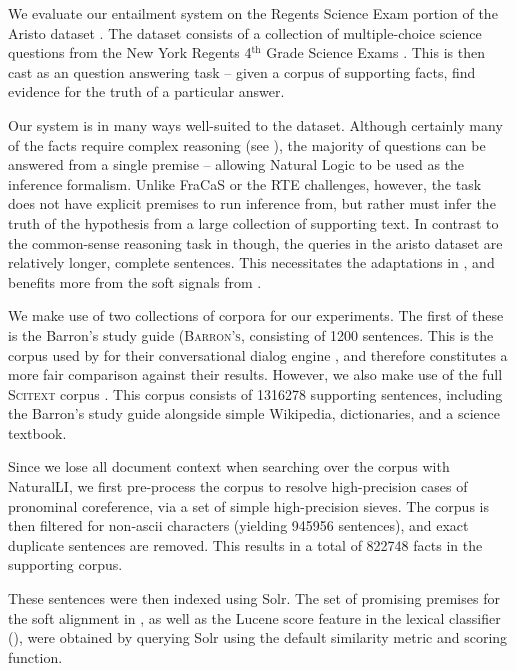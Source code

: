 %
%
We evaluate our entailment system on the Regents Science Exam portion of
  the Aristo dataset \cite{key:2013clark-aristo,key:2015clark-aristo}.
The dataset consists of a collection of multiple-choice science questions
  from the New York Regents 4$^{\textrm{th}}$ Grade Science Exams
  \cite{key:NYSED}.
This is then cast as an question answering task -- given a corpus of
  supporting facts, find evidence for the truth of a particular answer.

Our system is in many ways well-suited to the dataset.
Although certainly many of the facts require complex reasoning
  (see ), the majority of questions can be
  answered from a single premise -- allowing Natural Logic to be used
  as the inference formalism.
Unlike FraCaS or the RTE challenges, however, the task does not have explicit
  premises to run inference from, but rather must infer the truth of the
  hypothesis from a large collection of supporting text.
In contrast to the common-sense reasoning task in 
  though, the queries in the aristo dataset are relatively longer, complete sentences.
This necessitates the adaptations in , and benefits more from the
  soft signals from .

We make use of two collections of corpora for our experiments.
The first of these is the Barron's study guide (\textsc{Barron's}, 
  consisting of \num{1200} sentences.
This is the corpus used by  for their conversational
  dialog engine \knowbot, and therefore constitutes a more fair comparison against 
  their results.
However, we also make use of the full \textsc{Scitext} corpus \cite{key:2014clark-aristo}.
This corpus consists of \num{1316278} supporting sentences, 
  including the Barron's study guide alongside 
  simple Wikipedia, dictionaries, and a science textbook.

Since we lose all document context when searching over the corpus with NaturalLI,
  we first pre-process the corpus to resolve high-precision cases of
  pronominal coreference, via a set of simple high-precision sieves.
The corpus is then filtered for non-ascii characters (yielding \num{945956} sentences),
  and exact duplicate sentences are removed.
This results in a total of \num{822748} facts in the supporting corpus.

These sentences were then indexed using Solr.
The set of promising premises for the soft alignment in , as well as
  the Lucene score feature in the lexical classifier (),
  were obtained by querying Solr using the default similarity metric and scoring function.

